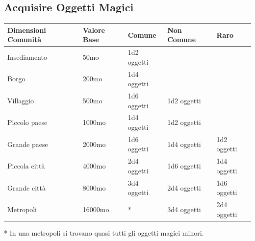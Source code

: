 \subsection{Acquisire Oggetti Magici}

\label{acquisire-oggetti-magici}

\bigskip

\begin{tabular}{lllll}
\textbf{Dimensioni Comunità} & \textbf{Valore Base} & \textbf{Comune} & \textbf{Non Comune} & \textbf{Raro}\\
\toprule
Insediamento  & 50mo & 1d2 oggetti     && \\
Borgo         & 200mo& 1d4 oggetti     && \\
Villaggio     & 500mo& 1d6 oggetti     & 1d2 oggetti    & \\
Piccolo paese & 1000mo               & 1d4 oggetti     & 1d2 oggetti    & \\
Grande paese  & 2000mo               & 1d6 oggetti     & 1d4 oggetti    & 1d2 oggetti\\
Piccola città & 4000mo               & 2d4 oggetti     & 1d6 oggetti    & 1d4 oggetti\\
Grande città  & 8000mo               & 3d4 oggetti      & 2d4 oggetti    & 1d6 oggetti\\
Metropoli     & 16000mo              & {*}             & 3d4 oggetti    & 2d4 oggetti\\
\end{tabular}

{*} In una metropoli si trovano quasi tutti gli oggetti magici minori.

